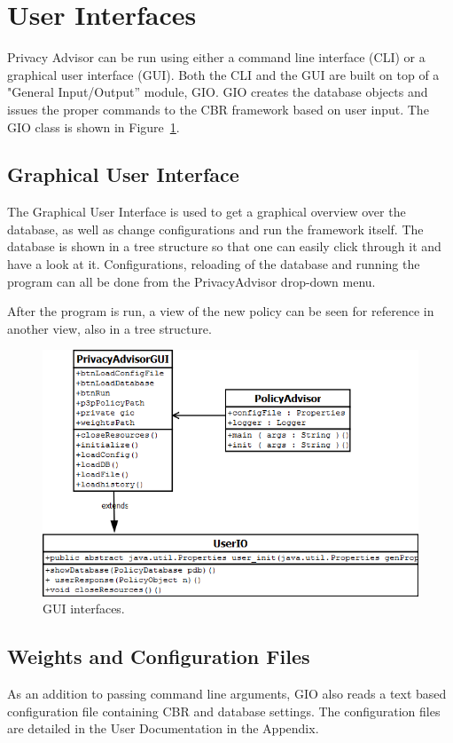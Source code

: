 \section{User Interfaces}
Privacy Advisor can be run using either a command line interface (CLI) or a graphical user interface (GUI). Both the CLI and the GUI are built on top of a "General Input/Output'' module, GIO. GIO creates the database objects and issues the proper commands to the CBR framework based on user input. The GIO class is shown in Figure~\ref{GUI_interface}. 


\subsection{Graphical User Interface} 
The Graphical User Interface is used to get a graphical overview over the database, as well as change configurations and run the framework itself. The database is shown in a tree structure so that one can easily click through it and have a look at it. Configurations, reloading of the database and running the program can all be done from the PrivacyAdvisor drop-down menu.

After the program is run, a view of the new policy can be seen for reference in another view, also in a tree structure.

\begin{figure}[htbp]
\begin{center}
\includegraphics[width = \textwidth]{DesignReport/uml/policyadvisorgui}
\caption{GUI interfaces.}
\label{GUI_interface}
\end{center}
\end{figure}

\subsection{Weights and Configuration Files}
As an addition to passing command line arguments, GIO also reads a text based configuration file containing CBR and database settings. The configuration files are detailed in the User Documentation in the Appendix. 